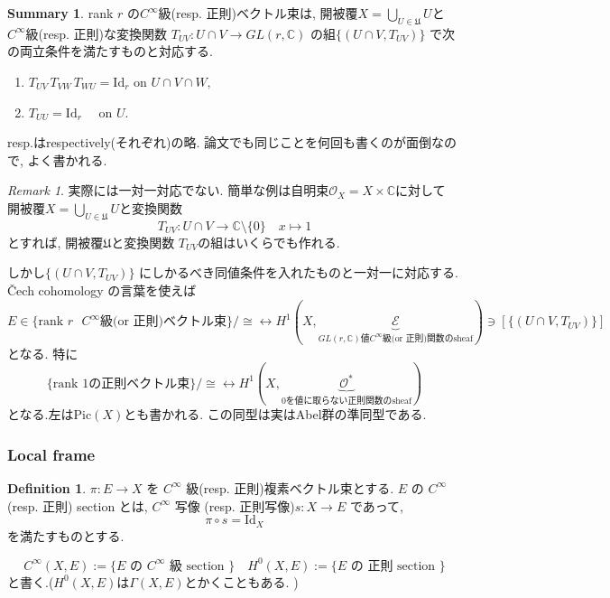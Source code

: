 \documentclass[dvipdfmx,a4paper,11pt]{article} %
\theoremstyle{definition}
\newtheorem{defn}[thm]{Definition}
\newtheorem{suma}[thm]{Summary}
\theoremstyle{remark}
\newtheorem{rem}[thm]{Remark}
\numberwithin{equation}{section}
\newcommand{\C}{\mathbb{C}}
\newcommand{\xr}[1]{\textcolor{red}{#1}}
\begin{document}
\begin{tcolorbox}[mybox]
\begin{suma}
 rank \(r\) の$C^\infty$級(resp. 正則)ベクトル束は, 開被覆$X=\bigcup_{U\in\mathfrak{U}}U$と$C^\infty$級(resp. 正則)な変換関数 \(T_{UV} : U \cap V \to GL(r,\mathbb{C})\) の組\(\{ (U \cap V , T_{UV})\}\) で次の両立条件を満たすものと対応する.
\begin{enumerate}
\item[(G-1)] $T_{UV}\,T_{VW}\,T_{WU}=\mathrm{Id}_r
\text{ on } U\cap V\cap W,$
\item[(G-2)] $T_{UU}=\mathrm{Id}_r
\quad
\text{ on } U.$
\end{enumerate}
\end{suma}
\end{tcolorbox}
resp.はrespectively(それぞれ)の略. 論文でも同じことを何回も書くのが面倒なので, よく書かれる.
\begin{rem}
実際には一対一対応でない. 簡単な例は自明束$\mathcal{O}_X=X \times \C$に対して
開被覆$X=\bigcup_{U\in\mathfrak{U}}U$と変換関数
$$
T_{UV} : U \cap V \to \C \setminus \{0\}
\quad x \mapsto 1
$$
とすれば,  開被覆$\mathfrak{U}$と変換関数 $T_{UV}$の組はいくらでも作れる. 


しかし\(\{ (U \cap V , T_{UV})\}\) にしかるべき同値条件を入れたものと一対一に対応する. \v{C}ech cohomology の言葉を使えば
$$
E \in \{\text{rank $r$ $C^{\infty}$級(or 正則)ベクトル束}\}/\cong
\leftrightarrow 
H^1(X, \underbrace{\mathcal{E}}_{\text{$GL(r,\mathbb{C})$値$C^{\infty}$級(or 正則)関数のsheaf}}) \ni [\{ (U \cap V , T_{UV})\}]
$$
となる.
特に
$$
\{\text{rank  $1$の正則ベクトル束}\}/\cong
\leftrightarrow 
H^1(X, \underbrace{\mathcal{O}^{*}}_{\text{0を値に取らない正則関数のsheaf}})
$$
となる.左は$\mathrm{Pic}(X)$とも書かれる. この同型は実はAbel群の準同型である. 
\end{rem}

\subsubsection{Local frame}
\begin{defn}
\(\pi\colon E\to X\) を \(C^{\infty}\) 級(resp. 正則)複素ベクトル束とする. \(E\) の  \(C^{\infty}\) (resp. 正則) section とは,  \(C^{\infty}\) 写像 (resp. 正則写像)\(s\colon X\longrightarrow E\) であって,
\[
\pi\circ s=\mathrm{Id}_X
\]
を満たすものとする.

\[
C^\infty(X,E):=\{\text{\(E\) の \(C^\infty\) 級 section }\}
\quad 
H^0(X,E) :=\{\text{\(E\) の 正則 section }\}
\]
と書く.($H^0(X,E)$は$\Gamma(X,E)$とかくこともある. )
\end{defn}
\end{document}
